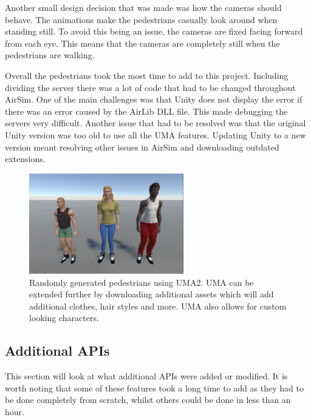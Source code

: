 Another small design decision that was made was how the cameras should behave. The animations make the pedestrians casually look around when standing still. To avoid this being an issue, the cameras are fixed facing forward from each eye. This means that the cameras are completely still when the pedestrians are walking. 

Overall the pedestrians took the most time to add to this project. Including dividing the server there was a lot of code that had to be changed throughout AirSim. One of the main challenges was that Unity does not display the error if there was an error caused by the AirLib DLL file. This made debugging the servers very difficult. Another issue that had to be resolved was that the original Unity version was too old to use all the UMA features. Updating Unity to a new version meant resolving other issues in AirSim and downloading outdated extensions. 
\begin{figure}[H]
    \centering
    \includegraphics[width=0.6\textwidth]{06_Implementation/00_AirSim/Diagrams/RandomPedestrians.JPG}
    \caption[UMA characters]{Randomly generated pedestrians using UMA2. UMA can be extended further by downloading additional assets which will add additional clothes, hair styles and more. UMA also allows for custom looking characters.} \label{06:umaCharacters}
\end{figure}

\subsection{Additional APIs}
This section will look at what additional APIs were added or modified.  It is worth noting that some of these features took a long time to add as they had to be done completely from scratch, whilst others could be done in less than an hour.

